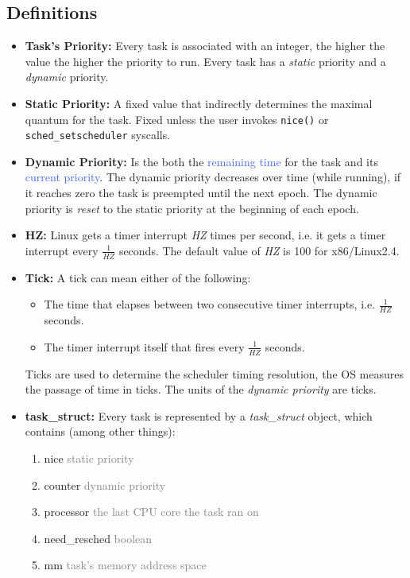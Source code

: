 \documentclass[openany,12pt]{book}
\newcommand{\code}[1]{\texttt{#1}}
\newcommand{\blue}[1]{\textcolor{RoyalBlue}{#1}}
\newcommand{\gray}[1]{\textcolor{gray}{#1}}
\begin{document}
\subsection*{Definitions}
\begin{itemize}
  \item \textbf{Task's Priority:} Every task is associated with an integer, the higher the value the higher the priority to run. Every task has a \textit{static} priority and a \textit{dynamic} priority.
  \item \textbf{Static Priority:} A fixed value that indirectly determines the maximal quantum for the task. Fixed unless the user invokes \code{nice()} or \code{sched\_setscheduler} syscalls.
  \item \textbf{Dynamic Priority:} Is the both the \blue{remaining time} for the task and its \blue{current priority}. The dynamic priority decreases over time (while running), if it reaches zero the task is preempted until the next epoch. The dynamic priority is \textit{reset} to the static priority at the beginning of each epoch.

  \item \textbf{HZ:} Linux gets a timer interrupt \textit{HZ} times per second, i.e. it gets a timer interrupt every \(\frac{1}{\textit{HZ}}\) seconds. The default value of \textit{HZ} is 100 for x86/Linux2.4.

  \item \textbf{Tick:} A tick can mean either of the following:
        \begin{itemize}
          \item The time that elapses between two consecutive timer interrupts, i.e. \(\frac{1}{\textit{HZ}}\) seconds.
          \item The timer interrupt itself that fires every \(\frac{1}{\textit{HZ}}\) seconds.
        \end{itemize}
        Ticks are used to determine the scheduler timing resolution, the OS measures the passage of time in ticks. The units of the \textit{dynamic priority} are ticks.

  \item \textbf{task\_struct:} Every task is represented by a \textit{task\_struct} object, which contains (among other things):
        \begin{enumerate}
          \item nice \gray{static priority}
          \item counter \gray{dynamic priority}
          \item processor \gray{the last CPU core the task ran on}
          \item need\_resched \gray{boolean}
          \item mm \gray{task's memory address space}
        \end{enumerate}


\end{itemize}
\end{document}
